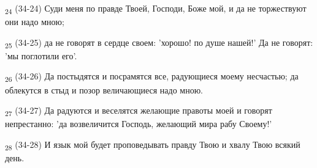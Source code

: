 \begin{tcolorbox}
\textsubscript{24} (34-24) Суди меня по правде Твоей, Господи, Боже мой, и да не торжествуют они надо мною;
\end{tcolorbox}
\begin{tcolorbox}
\textsubscript{25} (34-25) да не говорят в сердце своем: 'хорошо! по душе нашей!' Да не говорят: 'мы поглотили его'.
\end{tcolorbox}
\begin{tcolorbox}
\textsubscript{26} (34-26) Да постыдятся и посрамятся все, радующиеся моему несчастью; да облекутся в стыд и позор величающиеся надо мною.
\end{tcolorbox}
\begin{tcolorbox}
\textsubscript{27} (34-27) Да радуются и веселятся желающие правоты моей и говорят непрестанно: 'да возвеличится Господь, желающий мира рабу Своему!'
\end{tcolorbox}
\begin{tcolorbox}
\textsubscript{28} (34-28) И язык мой будет проповедывать правду Твою и хвалу Твою всякий день.
\end{tcolorbox}
